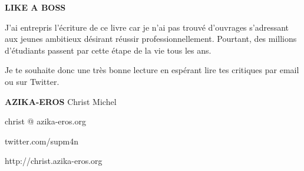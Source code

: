 \thispagestyle{empty}
\pagecolor{coverbackground}\afterpage{\nopagecolor}

\centering

\begin{center}
	{\Large \textbf{LIKE A BOSS} \par}
	\vspace{0.3cm}
	\vspace{0.5cm}
	{\par J'ai entrepris l'écriture de ce livre car je n’ai pas trouvé d’ouvrages s’adressant aux jeunes ambitieux désirant réussir professionnellement. Pourtant, des millions d’étudiants passent par cette étape de la vie tous les ans.}
	\vspace{0.2cm}
	{\par Je te souhaite donc une très bonne lecture en espérant lire tes critiques par email ou sur Twitter.}
	\vspace{0.5cm}
	{\par \textbf{AZIKA-EROS} Christ Michel}
	{\par christ @ azika-eros.org}
	{\par twitter.com/supm4n \\}
	{\par http://christ.azika-eros.org \\}
	\vspace{0.5cm}

\end{center} 